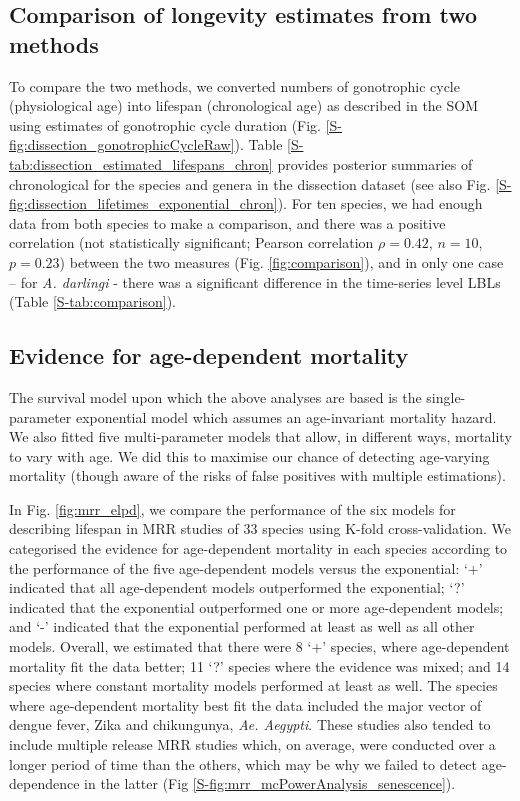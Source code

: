\documentclass[]{article}
\begin{document}
\subsection{Comparison of longevity estimates from two
methods}\label{comparison-of-longevity-estimates-from-two-methods}

To compare the two methods, we converted numbers of gonotrophic cycle
(physiological age) into lifespan (chronological age) as described in
the SOM using estimates of gonotrophic cycle duration (Fig. \ref{S-fig:dissection_gonotrophicCycleRaw}). Table \ref{S-tab:dissection_estimated_lifespans_chron} provides posterior summaries of chronological for the species and genera in the dissection dataset (see also Fig. \ref{S-fig:dissection_lifetimes_exponential_chron}). For ten species, we had enough data from both species to make a comparison, and there was a positive correlation (not
statistically significant; Pearson correlation $\rho=0.42$, $n=10$, $p=0.23$)
between the two measures (Fig. \ref{fig:comparison}), and in only one case -- for \emph{A.
darlingi} - there was a significant difference in the
time-series level LBLs (Table \ref{S-tab:comparison}).

\subsection{Evidence for age-dependent
mortality}\label{evidence-for-age-dependent-mortality}

The survival model upon which the above analyses are based is the
single-parameter exponential model which assumes an age-invariant
mortality hazard. We also fitted five multi-parameter models that allow,
in different ways, mortality to vary with age. We did this to maximise
our chance of detecting age-varying mortality (though aware of the risks
of false positives with multiple estimations).

In Fig. \ref{fig:mrr_elpd}, we compare the performance of the six models for describing
lifespan in MRR studies of 33 species using K-fold cross-validation. We
categorised the evidence for age-dependent mortality in each species
according to the performance of the five age-dependent models versus the
exponential: `+' indicated that all age-dependent models outperformed
the exponential; `?' indicated that the exponential outperformed one or
more age-dependent models; and `-' indicated that the exponential
performed at least as well as all other models. Overall, we estimated
that there were 8 `+' species, where age-dependent mortality fit the
data better; 11 `?' species where the evidence was mixed; and 14 species
where constant mortality models performed at least as well. The species
where age-dependent mortality best fit the data included the major
vector of dengue fever, Zika and chikungunya, \emph{Ae. Aegypti}. These
studies also tended to include multiple release MRR studies which, on
average, were conducted over a longer period of time than the others,
which may be why we failed to detect age-dependence in the latter (Fig
\ref{S-fig:mrr_mcPowerAnalysis_senescence}).
\end{document}
